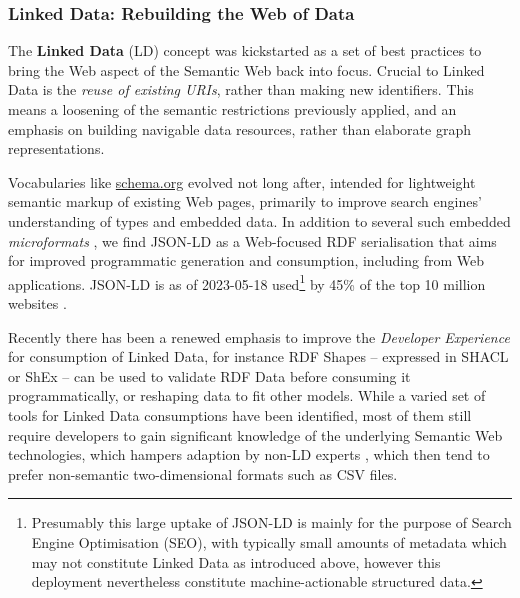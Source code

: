 \documentclass[fleqn,10pt,lineno]{wlpeerjlua}
\begin{document}
\subsubsection*{Linked Data: Rebuilding the Web of Data}\label{sec:ld-web}

The \textbf{Linked Data} (LD) concept \autocite{bizerLinkedDataStory2009a} was kickstarted as a set of best practices \autocite{LinkedDataDesign} to bring the Web aspect of the Semantic Web back into focus. Crucial to Linked Data is the \emph{reuse of existing URIs}, rather than making new identifiers. This means a loosening of the semantic restrictions previously applied, and an emphasis on building navigable data resources, rather than elaborate graph representations.

Vocabularies like \href{https://schema.org/}{schema.org} evolved not long after, intended for lightweight semantic markup of existing Web pages, primarily to improve search engines' understanding of types and embedded data. In addition to several such embedded \emph{microformats} \autocite{OpenGraphProtocol,w3-rdfa-primer,HTMLStandard}, we find JSON-LD \autocite{w3-json-ld} as a Web-focused RDF serialisation that aims for improved programmatic generation and consumption, including from Web applications. JSON-LD is as of 2023-05-18 used\footnote{Presumably this large uptake of JSON-LD is mainly for the purpose of Search Engine Optimisation (SEO), with typically small amounts of metadata which may not constitute Linked Data as introduced above, however this deployment nevertheless constitute machine-actionable structured data.} by 45\% of the top 10 million websites \autocite{UsageStatisticsJSONLD}.

Recently there has been a renewed emphasis to improve the \emph{Developer Experience} \autocite{DesigningLinkedData2018} for consumption of Linked Data, for instance RDF Shapes -- expressed in SHACL \autocite{w3-shacl} or ShEx \autocite{ShapeExpressionsShEx} -- can be used to validate RDF Data \autocite{gayoValidatingRDFData2017a,thorntonUsingShapeExpressions2019a} before consuming it programmatically, or reshaping data to fit other models. While a varied set of tools for Linked Data consumptions have been identified, most of them still require developers to gain significant knowledge of the underlying Semantic Web technologies, which hampers adaption by non-LD experts \autocite{klimekSurveyToolsLinked2019a}, which then tend to prefer non-semantic two-dimensional formats such as CSV files.
\end{document}
